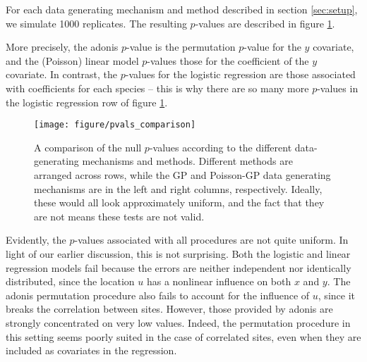 \documentclass{article}
\begin{document}
For each data generating mechanism and method described in section
\ref{sec:setup}, we simulate 1000 replicates. The resulting $p$-values are
described in figure \ref{fig:pvals_comparison}.

More precisely, the adonis $p$-value is the permutation $p$-value for the $y$
covariate, and the (Poisson) linear model $p$-values those for the coefficient
of the $y$ covariate. In contrast, the $p$-values for the logistic regression
are those associated with coefficients for each species -- this is why there are
so many more $p$-values in the logistic regression row of figure
\ref{fig:pvals_comparison}.

\begin{figure}
  \centering
  \texttt{[image: figure/pvals\_comparison]}
  \caption{\label{fig:pvals_comparison} A comparison of the null $p$-values
    according to the different data-generating mechanisms and methods. Different
    methods are arranged across rows, while the GP and Poisson-GP data
    generating mechanisms are in the left and right columns, respectively.
    Ideally, these would all look approximately uniform, and the fact that they
    are not means these tests are not valid.}
\end{figure}

Evidently, the $p$-values associated with all procedures are not quite uniform.
In light of our earlier discussion, this is not surprising. Both the logistic
and linear regression models fail because the errors are neither independent nor
identically distributed, since the location $u$ has a nonlinear influence on
both $x$ and $y$. The adonis permutation procedure also fails to account for the
influence of $u$, since it breaks the correlation between sites. However, those
provided by adonis are strongly concentrated on very low values. Indeed, the
permutation procedure in this setting seems poorly suited in the case of
correlated sites, even when they are included as covariates in the regression.



\end{document}
